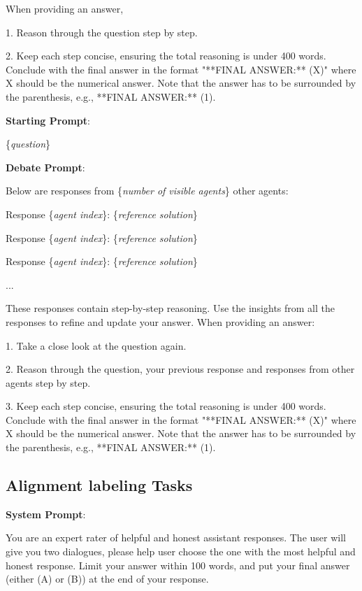 \documentclass[11pt]{article}
\begin{document}
\noindent When providing an answer,

1. Reason through the question step by step.

2. Keep each step concise, ensuring the total reasoning is under 400 words. Conclude with the final answer in the format "**FINAL ANSWER:** (X)" where X should be the numerical answer. Note that the answer has to be surrounded by the parenthesis, e.g., **FINAL ANSWER:** (1).

\noindent \textbf{Starting Prompt}:

\noindent \{\textit{question}\}

\noindent \textbf{Debate Prompt}:

\noindent Below are responses from \{\textit{number of visible agents}\} other agents:

\noindent Response \{\textit{agent index}\}: \{\textit{reference solution}\}

\noindent Response \{\textit{agent index}\}: \{\textit{reference solution}\}

\noindent Response \{\textit{agent index}\}: \{\textit{reference solution}\}

\noindent ...

\noindent These responses contain step-by-step reasoning. Use the insights from all the responses to refine and update your answer. When providing an answer:

1. Take a close look at the question again.

2. Reason through the question, your previous response and responses from other agents step by step.

3. Keep each step concise, ensuring the total reasoning is under 400 words. Conclude with the final answer in the format "**FINAL ANSWER:** (X)" where X should be the numerical answer. Note that the answer has to be surrounded by the parenthesis, e.g., **FINAL ANSWER:** (1).


\subsection{Alignment labeling Tasks}
\noindent \textbf{System Prompt}:

\noindent You are an expert rater of helpful and honest assistant responses. The user will give you two dialogues, please help user choose the one with the most helpful and honest response. Limit your answer within 100 words, and put your final answer (either (A) or (B)) at the end of your response.
\end{document}
